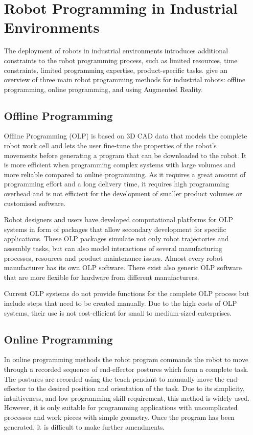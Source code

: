\section{Robot Programming in Industrial Environments}\label{subsec:RP in Industrial Enviroments}
The deployment of robots in industrial environments introduces additional constraints to the robot programming process, such as limited resources, time constraints, limited programming expertise, product-specific tasks.
\cite{pan2012recent} give an overview of three main robot programming methods for industrial robots: offline programming, online programming, and using Augmented Reality. 

\subsection{Offline Programming}\label{sssec:Offline Programming}
Offline Programming (OLP) is based on 3D CAD data that models the complete robot work cell and lets the user fine-tune the properties of the robot's movements before generating a program that can be downloaded to the robot. 
It is more efficient when programming complex systems with large volumes and more reliable compared to online programming. 
As it requires a great amount of programming effort and a long delivery time, it requires high programming overhead and is not efficient for the development of smaller product volumes or customised software.

Robot designers and users have developed computational platforms for OLP systems in form of packages that allow secondary development for specific applications. 
These OLP packages simulate not only robot trajectories and assembly tasks, but can also model interactions of several manufacturing processes, resources and product maintenance issues. 
Almost every robot manufacturer has its own OLP software. 
There exist also generic OLP software that are more flexible for hardware from different manufacturers.

Current OLP systems do not provide functions for the complete OLP process but include steps that need to be created manually. 
Due to the high costs of OLP systems, their use is not cost-efficient for small to medium-sized enterprises.

\subsection{Online Programming}\label{sssec:Online Programming}
In online programming methods the robot program commands the robot to move through a recorded sequence of end-effector postures which form a complete task. 
The postures are recorded using the teach pendant to manually move the end-effector to the desired position and orientation of the task. 
Due to its simplicity, intuitiveness, and low programming skill requirement, this method is widely used. 
However, it is only suitable for programming applications with uncomplicated processes and work pieces with simple geometry. 
Once the program has been generated, it is difficult to make further amendments.

